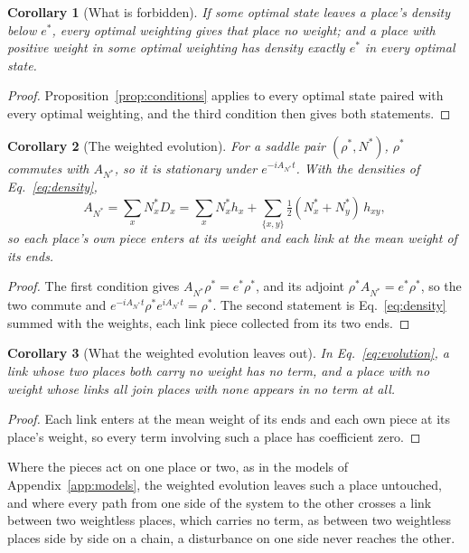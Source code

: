 \documentclass[aps,prd,reprint,superscriptaddress]{revtex4-2}
\newtheorem{corollary}{Corollary}
\begin{document}
\begin{corollary}[What is forbidden]\label{cor:forbids}
If some optimal state leaves a place's density below $e^*$, every optimal weighting gives that place no weight; and a place with positive weight in some optimal weighting has density exactly $e^*$ in every optimal state.
\end{corollary}
\begin{proof}
Proposition~\ref{prop:conditions} applies to every optimal state paired with every optimal weighting, and the third condition then gives both statements.
\end{proof}

\begin{corollary}[The weighted evolution]\label{cor:evolution}
For a saddle pair $(\rho^*, N^*)$, $\rho^*$ commutes with $A_{N^*}$, so it is stationary under $e^{-iA_{N^*}t}$. With the densities of Eq.~\eqref{eq:density},
\begin{equation}
  A_{N^*} = \sum_x N^*_x D_x = \sum_x N^*_x h_x + \sum_{\{x,y\}} \tfrac12 (N^*_x + N^*_y)\, h_{xy} ,
  \label{eq:evolution}
\end{equation}
so each place's own piece enters at its weight and each link at the mean weight of its ends.
\end{corollary}
\begin{proof}
The first condition gives $A_{N^*}\rho^* = e^*\rho^*$, and its adjoint $\rho^* A_{N^*} = e^*\rho^*$, so the two commute and $e^{-iA_{N^*}t}\rho^* e^{iA_{N^*}t} = \rho^*$. The second statement is Eq.~\eqref{eq:density} summed with the weights, each link piece collected from its two ends.
\end{proof}

\begin{corollary}[What the weighted evolution leaves out]\label{cor:crossing}
In Eq.~\eqref{eq:evolution}, a link whose two places both carry no weight has no term, and a place with no weight whose links all join places with none appears in no term at all.
\end{corollary}
\begin{proof}
Each link enters at the mean weight of its ends and each own piece at its place's weight, so every term involving such a place has coefficient zero.
\end{proof}
Where the pieces act on one place or two, as in the models of Appendix~\ref{app:models}, the weighted evolution leaves such a place untouched, and where every path from one side of the system to the other crosses a link between two weightless places, which carries no term, as between two weightless places side by side on a chain, a disturbance on one side never reaches the other.
\end{document}

